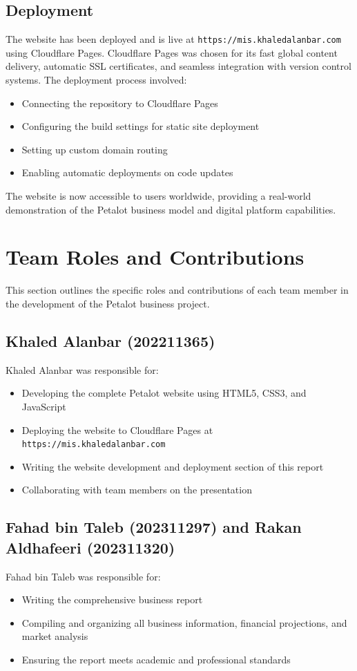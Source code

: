 \documentclass[11pt,a4paper]{article}
\begin{document}
\subsection{Deployment}

The website has been deployed and is live at \texttt{https://mis.khaledalanbar.com} using Cloudflare Pages. Cloudflare Pages was chosen for its fast global content delivery, automatic SSL certificates, and seamless integration with version control systems. The deployment process involved:

\begin{itemize}
    \item Connecting the repository to Cloudflare Pages
    \item Configuring the build settings for static site deployment
    \item Setting up custom domain routing
    \item Enabling automatic deployments on code updates
\end{itemize}

The website is now accessible to users worldwide, providing a real-world demonstration of the Petalot business model and digital platform capabilities.

\newpage
\section{Team Roles and Contributions}

This section outlines the specific roles and contributions of each team member in the development of the Petalot business project.

\subsection{Khaled Alanbar (202211365)}
Khaled Alanbar was responsible for:
\begin{itemize}
    \item Developing the complete Petalot website using HTML5, CSS3, and JavaScript
    \item Deploying the website to Cloudflare Pages at \texttt{https://mis.khaledalanbar.com}
    \item Writing the website development and deployment section of this report
    \item Collaborating with team members on the presentation
\end{itemize}

\subsection{Fahad bin Taleb (202311297) and Rakan Aldhafeeri (202311320)}
Fahad bin Taleb was responsible for:
\begin{itemize}
    \item Writing the comprehensive business report
    \item Compiling and organizing all business information, financial projections, and market analysis
    \item Ensuring the report meets academic and professional standards
\end{itemize}
\end{document}
